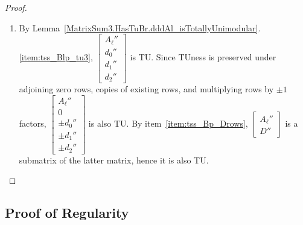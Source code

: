 \begin{proof}
\begin{enumerate}
        \item By Lemma~\ref{MatrixSum3.HasTuBr.dddAl_isTotallyUnimodular}.\ref{item:tss_Blp_tu3}, $\begin{bmatrix} A_{\ell}'' \\ d_{0}'' \\ d_{1}'' \\ d_{2}'' \end{bmatrix}$ is TU. Since TUness is preserved under adjoining zero rows, copies of existing rows, and multiplying rows by $\pm 1$ factors, $\begin{bmatrix} A_{\ell}'' \\ 0 \\ \pm d_{0}'' \\ \pm d_{1}'' \\ \pm d_{2}'' \end{bmatrix}$ is also TU. By item~\ref{item:tss_Bp_Drows}, $\begin{bmatrix} A_{\ell}'' \\ D'' \end{bmatrix}$ is a submatrix of the latter matrix, hence it is also TU.
    \end{enumerate}
\end{proof}


\subsection{Proof of Regularity}

